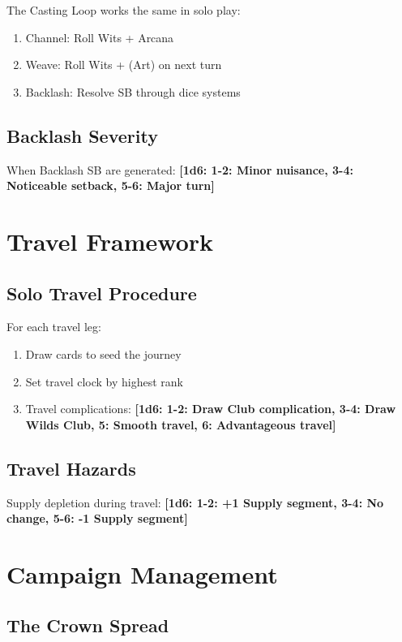 \documentclass[11pt]{article}
\newcommand{\dice}[1]{\textbf{[1d6: #1]}}
\begin{document}
The Casting Loop works the same in solo play:
\begin{enumerate}
    \item Channel: Roll Wits + Arcana
    \item Weave: Roll Wits + (Art) on next turn
    \item Backlash: Resolve SB through dice systems
\end{enumerate}

\subsection{Backlash Severity}

When Backlash SB are generated:
\dice{1-2: Minor nuisance, 3-4: Noticeable setback, 5-6: Major turn}

\section{Travel Framework}

\subsection{Solo Travel Procedure}

For each travel leg:
\begin{enumerate}
    \item Draw cards to seed the journey
    \item Set travel clock by highest rank
    \item Travel complications:
    \dice{1-2: Draw Club complication, 3-4: Draw Wilds Club, 5: Smooth travel, 6: Advantageous travel}
\end{enumerate}

\subsection{Travel Hazards}

Supply depletion during travel:
\dice{1-2: +1 Supply segment, 3-4: No change, 5-6: -1 Supply segment}

\section{Campaign Management}

\subsection{The Crown Spread}
\end{document}
